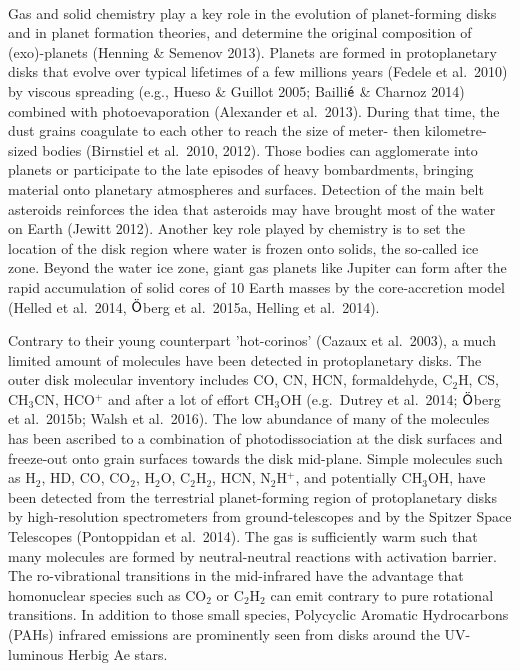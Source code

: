 \documentclass[10pt,fleqn,twoside]{article}
\begin{document}
\vspace{0.5em}\\
Gas and solid chemistry play a key role in the evolution of planet-forming disks and in planet formation theories, and determine the original composition of (exo)-planets (Henning \& Semenov 2013).  Planets are formed in protoplanetary disks that evolve over typical lifetimes of a few millions years (Fedele et al.\ 2010) by viscous spreading (e.g., Hueso \& Guillot 2005; Bailli$\acute{\textsf e}$ \& Charnoz 2014) combined with photoevaporation (Alexander et al.\ 2013). During that time, the dust grains coagulate to each other to reach the size of meter- then kilometre- sized bodies (Birnstiel et al.\ 2010, 2012). Those bodies can agglomerate into planets or participate to the late episodes of heavy bombardments, bringing material onto planetary atmospheres and surfaces. Detection of the main belt asteroids reinforces the idea that asteroids may have brought most of the water on Earth (Jewitt 2012). Another key role played by chemistry is to set the location of the disk region where water is frozen onto solids, the so-called ice zone. Beyond the water ice zone, giant gas planets like Jupiter can form after the rapid accumulation of solid cores of 10 Earth masses by the core-accretion model (Helled et al.\ 2014, $\ddot{\textsf O}$berg et al.\ 2015a, Helling et al.\ 2014).

Contrary to their young counterpart 'hot-corinos' (Cazaux et al.\ 2003), a much limited amount of molecules have been detected in protoplanetary disks. The outer disk molecular inventory includes CO, CN, HCN, formaldehyde, C$_2$H, CS, CH$_3$CN, HCO$^+$ and after a lot of effort CH$_3$OH (e.g.\ Dutrey et al.\ 2014;  $\ddot{\textsf O}$berg et al.\ 2015b; Walsh et al.\ 2016). The low abundance of many of the molecules has been ascribed to a combination of photodissociation at the disk surfaces and freeze-out onto grain surfaces towards the disk mid-plane. Simple molecules such as H$_2$, HD, CO, CO$_2$, H$_2$O, C$_2$H$_2$, HCN, N$_2$H$^+$, and potentially CH$_3$OH, have been detected from the terrestrial planet-forming region of protoplanetary disks by high-resolution spectrometers from ground-telescopes and by the Spitzer Space Telescopes (Pontoppidan et al.\ 2014). The gas is sufficiently warm such that many molecules are formed by neutral-neutral reactions with activation barrier. The ro-vibrational transitions in the mid-infrared have the advantage that homonuclear species such as CO$_2$ or C$_2$H$_2$ can emit contrary to pure rotational transitions. In addition to those small species, Polycyclic Aromatic Hydrocarbons (PAHs) infrared emissions are prominently seen from disks around the UV-luminous Herbig Ae stars. 
\end{document}
